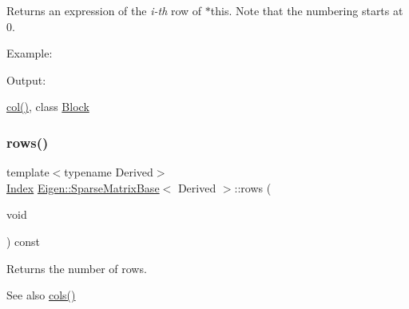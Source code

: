 \begin{DoxyReturn}{Returns}
an expression of the {\itshape i-\/th} row of $\ast$this. Note that the numbering starts at 0.
\end{DoxyReturn}
Example\+: 
\begin{DoxyCodeInclude}{0}
\end{DoxyCodeInclude}
 Output\+: 
\begin{DoxyVerbInclude}
\end{DoxyVerbInclude}
 \mbox{\hyperlink{class_eigen_1_1_sparse_matrix_base_a8f4eaa3c3921ef3823ffc69ebcc356af}{col()}}, class \mbox{\hyperlink{class_eigen_1_1_block}{Block}} \mbox{\label{class_eigen_1_1_sparse_matrix_base_a1944e9fa9ce7937bfc3a87b2cb94371f}} 
\subsubsection{\texorpdfstring{rows()}{rows()}}
{\footnotesize\ttfamily template$<$typename Derived$>$ \\
\mbox{\hyperlink{struct_eigen_1_1_eigen_base_a554f30542cc2316add4b1ea0a492ff02}{Index}} \mbox{\hyperlink{class_eigen_1_1_sparse_matrix_base}{Eigen\+::\+Sparse\+Matrix\+Base}}$<$ Derived $>$\+::rows (\begin{DoxyParamCaption}\item[{void}]{ }\end{DoxyParamCaption}) const\hspace{0.3cm}{\ttfamily [inline]}}

\begin{DoxyReturn}{Returns}
the number of rows. 
\end{DoxyReturn}
\begin{DoxySeeAlso}{See also}
\mbox{\hyperlink{class_eigen_1_1_sparse_matrix_base_aca7ce296424ef6e478ab0fb19547a7ee}{cols()}} 
\end{DoxySeeAlso}
\mbox{\label{class_eigen_1_1_sparse_matrix_base_adf94a8461a773fb4b0daedaa9980b054}} 
